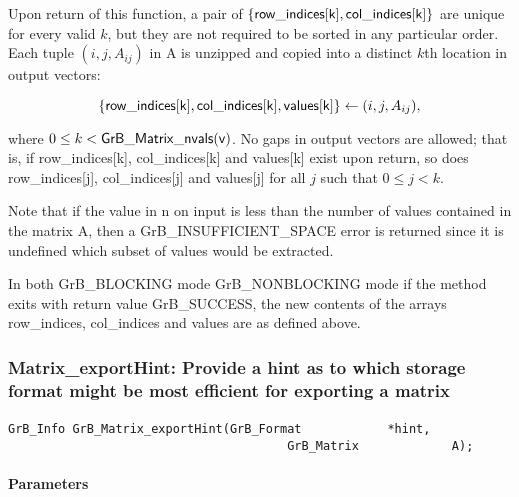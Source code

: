 Upon return of this function, a pair of $\{{\sf row\_indices[k], col\_indices[k]}\}$ are unique for every valid $k$, 
but they are not required to be sorted in any particular order.
Each tuple $(i,j,A_{ij})$ in {\sf A} is unzipped and copied into a distinct $k$th location in output vectors:  

$$\{{\sf row\_indices[k]}, {\sf col\_indices[k]}, {\sf values[k]}\} \leftarrow (i,j,A_{ij}),$$

where $0 \leq k < {\sf GrB\_Matrix\_nvals(v)}$. 
No gaps in output vectors are allowed; that is, if {\sf row\_indices[k]},  {\sf col\_indices[k]}  and {\sf values[k]} exist upon return, 
so does {\sf row\_indices[j]}, {\sf col\_indices[j]} and {\sf values[j]} for all $j$ such that $0 \leq j < k$.

Note that if the value in {\sf n} on input is less than the number of values
contained in the matrix {\sf A}, then a {\sf GrB\_INSUFFICIENT\_SPACE} error 
is returned since it is undefined which subset of values would
be extracted.

In both {\sf GrB\_BLOCKING} mode {\sf GrB\_NONBLOCKING} mode
if the method exits with return value {\sf GrB\_SUCCESS}, the  new 
contents of the arrays {\sf row\_indices}, {\sf col\_indices} and {\sf values} are as defined above.  



\subsubsection{{\sf Matrix\_exportHint}: Provide a hint as to which storage format might be most efficient for exporting a matrix }
\label{Sec:Matrix_exportHint}

\paragraph{\syntax}

\begin{Verbatim}[samepage=true]    
        GrB_Info GrB_Matrix_exportHint(GrB_Format            *hint,
                                       GrB_Matrix             A);
\end{Verbatim}

\paragraph{Parameters}

